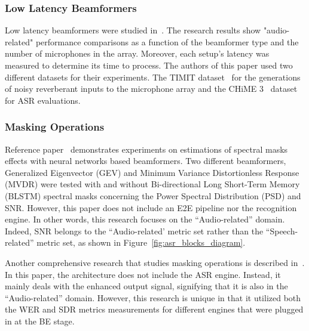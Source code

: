 

\subsubsection{Low Latency Beamformers}
Low latency beamformers were studied in~\cite{9003849}.
The research results show 
"audio-related" performance comparisons
as a function of the beamformer type and the number
of microphones in the array.
Moreover, each setup's latency was measured to determine 
its time to process. 
The authors of this paper used
two different datasets for their experiments.
The TIMIT dataset~\cite{timitDS} for the generations of noisy reverberant
inputs to the microphone array and the CHiME 3~\cite{chime3DS} dataset
for ASR evaluations.


\subsubsection{Masking Operations}
Reference paper~\cite{7471664} demonstrates experiments on estimations of spectral masks effects
with neural networks based beamformers.
Two different beamformers,  Generalized Eigenvector (GEV)
and Minimum Variance Distortionless Response (MVDR) were tested with and without Bi-directional Long Short-Term Memory (BLSTM)
spectral masks concerning the Power Spectral Distribution (PSD)
and SNR.
However, this paper does not include an E2E pipeline nor the recognition engine.
In other words, this research focuses on the ``Audio-related'' domain.
Indeed, SNR belongs to the
``Audio-related' metric set rather than the
``Speech-related'' metric set,
as shown in Figure~\ref{fig:asr_blocks_diagram}.
\bigskip

Another comprehensive research 
that studies masking operations
is described in~\cite{8466865}.
In this paper, the architecture does not include
the ASR engine. 
Instead, it mainly deals with the enhanced output signal,
signifying that it is also in the ``Audio-related'' domain.
However, this research is unique in that
it utilized both the WER and SDR metrics measurements
for different engines that were plugged in at the BE stage.


